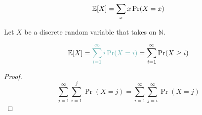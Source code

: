 
\begin{frame}{}
  \begin{definition}[Expectation]
    \[
      \operatorname*{\mathbb{E}}[X] = \sum_{x} x \Pr(X = x)
    \]
  \end{definition}

  \pause
  \vspace{0.50cm}
  \begin{theorem}
    Let $X$ be a discrete random variable that takes on  $\mathbb{N}$.

    \[
      \E[X] = \textcolor{teal!60}{\sum_{i=1}^{\infty} i \Pr(X = i)} = \sum_{i=1}^{\infty} \Pr(X \ge i)
    \]
  \end{theorem}
  \pause
  \begin{proof}
    \[
      \sum_{j=1}^{\infty} \sum_{i=1}^{j} \Pr(X = j) = \sum_{i=1}^{\infty} \sum_{j=i}^{\infty} \Pr(X = j)
    \]
  \end{proof}
\end{frame}



